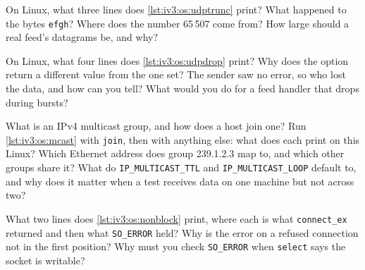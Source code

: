 \begin{question}\label{iq:iv3:operating-systems-concurrency-and-networks:24}
On Linux, what three lines does \cref{lst:iv3:os:udptrunc} print? What happened to the bytes \texttt{efgh}? Where does the number 65\,507 come from? How large should a real feed's datagrams be, and why?
\label{lst:iv3:os:udptrunc}
\end{question}

\begin{question}\label{iq:iv3:operating-systems-concurrency-and-networks:25}
On Linux, what four lines does \cref{lst:iv3:os:udpdrop} print? Why does the option return a different value from the one set? The sender saw no error, so who lost the data, and how can you tell? What would you do for a feed handler that drops during bursts?
\label{lst:iv3:os:udpdrop}
\end{question}

\begin{question}\label{iq:iv3:operating-systems-concurrency-and-networks:26}
What is an IPv4 multicast group, and how does a host join one? Run \cref{lst:iv3:os:mcast} with \texttt{join}, then with anything else: what does each print on this Linux? Which Ethernet address does group 239.1.2.3 map to, and which other groups share it? What do \texttt{IP\_MULTICAST\_TTL} and \texttt{IP\_MULTICAST\_LOOP} default to, and why does it matter when a test receives data on one machine but not across two?
\label{lst:iv3:os:mcast}
\end{question}

\begin{question}\label{iq:iv3:operating-systems-concurrency-and-networks:27}
What two lines does \cref{lst:iv3:os:nonblock} print, where each is what \texttt{connect\_ex} returned and then what \texttt{SO\_ERROR} held? Why is the error on a refused connection not in the first position? Why must you check \texttt{SO\_ERROR} when \texttt{select} says the socket is writable?
\label{lst:iv3:os:nonblock}
\end{question}

